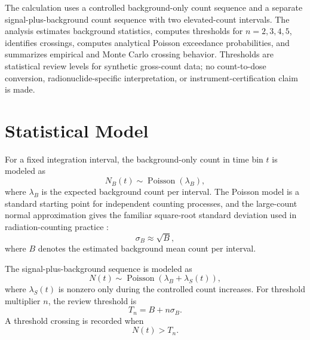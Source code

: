 \documentclass[11pt,twocolumn]{article}
\newcommand{\Pois}{\operatorname{Poisson}}
\begin{document}
The calculation uses a controlled background-only count sequence and a separate signal-plus-background count sequence with two elevated-count intervals. The analysis estimates background statistics, computes thresholds for \(n=2,3,4,5\), identifies crossings, computes analytical Poisson exceedance probabilities, and summarizes empirical and Monte Carlo crossing behavior. Thresholds are statistical review levels for synthetic gross-count data; no count-to-dose conversion, radionuclide-specific interpretation, or instrument-certification claim is made.

\section{Statistical Model}

For a fixed integration interval, the background-only count in time bin \(t\) is modeled as
\begin{equation}
N_B(t) \sim \Pois(\lambda_B),
\label{eq:background-poisson}
\end{equation}
where \(\lambda_B\) is the expected background count per interval. The Poisson model is a standard starting point for independent counting processes, and the large-count normal approximation gives the familiar square-root standard deviation used in radiation-counting practice \cite{Knoll2010,NISTHandbook}:
\begin{equation}
\sigma_B \approx \sqrt{B},
\label{eq:poisson-std}
\end{equation}
where \(B\) denotes the estimated background mean count per interval.

The signal-plus-background sequence is modeled as
\begin{equation}
N(t) \sim \Pois\!\left(\lambda_B+\lambda_S(t)\right),
\label{eq:signal-poisson}
\end{equation}
where \(\lambda_S(t)\) is nonzero only during the controlled count increases. For threshold multiplier \(n\), the review threshold is
\begin{equation}
T_n = B+n\sigma_B.
\label{eq:threshold}
\end{equation}
A threshold crossing is recorded when
\begin{equation}
N(t)>T_n.
\label{eq:crossing}
\end{equation}
\end{document}
